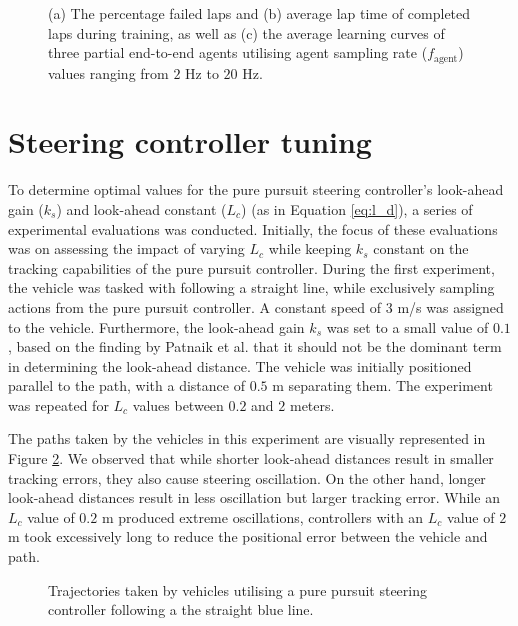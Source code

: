 \begin{figure}[htb!]
    \centering
    
    \caption[Learning curves for partial end-to-end agents trained with different agent sampling rates]{(a) The percentage failed laps and (b) average lap time of completed laps during training, as well as (c) the average learning curves of three partial end-to-end agents utilising agent sampling rate ($f_{\text{agent}}$) values ranging from $2$ Hz to $20$ Hz.}
    \label{fig:f_agent_pete}
\end{figure}





\section{Steering controller tuning}

To determine optimal values for the pure pursuit steering controller's look-ahead gain ($k_s$) and look-ahead constant ($L_c$) (as in Equation \ref{eq:l_d}), a series of experimental evaluations was conducted. 
Initially, the focus of these evaluations was on assessing the impact of varying $L_c$ while keeping $k_s$ constant on the tracking capabilities of the pure pursuit controller.
During the first experiment, the vehicle was tasked with following a straight line, while exclusively sampling actions from the pure pursuit controller. 
A constant speed of $3$ m/s was assigned to the vehicle.
Furthermore, the look-ahead gain $k_s$ was set to a small value of $0.1$, based on the finding by Patnaik et al. \cite{Patnaik2020} that it should not be the dominant term in determining the look-ahead distance.
The vehicle was initially positioned parallel to the path, with a distance of $0.5$ m separating them. 
The experiment was repeated for $L_c$ values between $0.2$ and $2$ meters.

The paths taken by the vehicles in this experiment are visually represented in Figure \ref{fig:lfc}. 
We observed that while shorter look-ahead distances result in smaller tracking errors, they also cause steering oscillation.
On the other hand, longer look-ahead distances result in less oscillation but larger tracking error.
While an $L_c$ value of $0.2$ m produced extreme oscillations, controllers with an $L_c$ value of $2$ m took excessively long to reduce the positional error between the vehicle and path. 

\begin{figure}[htb!]
    \centering
    
    \caption[Tracjectories taken by vehicles following a straight line starting from an offset position]{Trajectories taken by vehicles utilising a pure pursuit steering controller following a the straight blue line.}
    \label{fig:lfc}
\end{figure}

